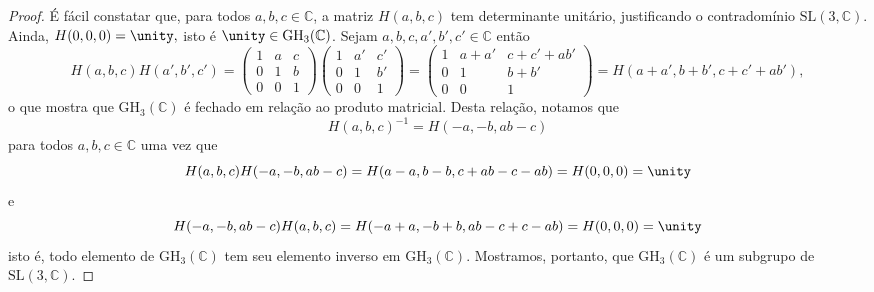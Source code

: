 \begin{proof}
    É fácil constatar que, para todos \(a,b,c \in \mathbb{C}\), a matriz \(H(a,b,c)\) tem determinante unitário, justificando o contradomínio \(\mathrm{SL}(3, \mathbb{C})\). Ainda, \(H(0,0,0) = \unity,\) isto é \(\unity \in \mathrm{GH}_3(\mathbb{C})\). Sejam \(a,b,c,a',b',c' \in \mathbb{C}\) então
    \begin{equation*}
        H(a,b,c)H(a',b',c') =
        \begin{pmatrix}
            1 & a & c\\
            0 & 1 & b\\
            0 & 0 & 1
        \end{pmatrix}
        \begin{pmatrix}
            1 & a' & c'\\
            0 & 1 & b'\\
            0 & 0 & 1
        \end{pmatrix} =
        \begin{pmatrix}
            1 & a + a' & c + c' + ab'\\
            0 & 1 & b + b'\\
            0 & 0 & 1
        \end{pmatrix}
        = H(a+a', b+b', c+c'+ab'),
    \end{equation*}
    o que mostra que \(\mathrm{GH}_3(\mathbb{C})\) é fechado em relação ao produto matricial. Desta relação, notamos que
    \begin{equation*}
        H(a,b,c)^{-1} = H(-a,-b,ab-c)
    \end{equation*}
    para todos \(a,b,c \in \mathbb{C}\) uma vez que
    \begin{equation*}
        H(a,b,c)H(-a,-b,ab-c) = H(a-a, b-b, c + ab - c -ab) = H(0,0,0) = \unity
    \end{equation*}
    e
    \begin{equation*}
        H(-a,-b,ab-c)H(a,b,c) = H(-a+a, -b+b, ab - c + c - ab) = H(0,0,0) = \unity
    \end{equation*}
    isto é, todo elemento de \(\mathrm{GH}_3(\mathbb{C})\) tem seu elemento inverso em \(\mathrm{GH}_3(\mathbb{C})\). Mostramos, portanto, que \(\mathrm{GH}_3(\mathbb{C})\) é um subgrupo de \(\mathrm{SL}(3, \mathbb{C})\).
\end{proof}

